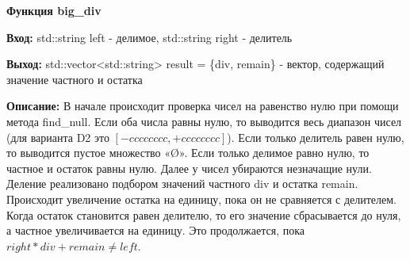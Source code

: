 \textbf{Функция big\_div } \par
\textbf{Вход:} std::string left - делимое, std::string right - делитель \par
\textbf{Выход:} std::vector<std::string> result = \{div, remain\} - вектор, содержащий значение частного и остатка\par
\textbf{Описание:} В начале происходит проверка чисел на равенство нулю при помощи метода find\_null. Если оба числа равны нулю, то выводится весь диапазон чисел (для варианта D2 это $[-cccccccc, +cccccccc]$). Если только делитель равен нулю, то выводится пустое множество «Ø». Если только делимое равно нулю, то частное и остаток равны нулю. Далее у чисел убираются незначащие нули. Деление реализовано подбором значений частного div и остатка remain. Происходит увеличение остатка на единицу, пока он не сравняется с делителем. Когда остаток становится равен делителю, то его значение сбрасывается до нуля, а частное увеличивается на единицу. Это продолжается, пока $right * div + remain \not= left$.\par
\vspace{10pt}


